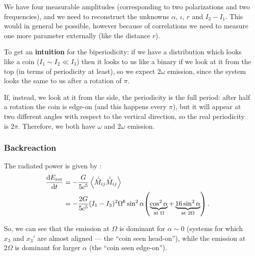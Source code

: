 \documentclass[main.tex]{subfiles}
\begin{document}

We have four measurable amplitudes (corresponding to two polarizations and two frequencies), and we need to reconstruct the unknowns \(\alpha \), \(\iota \), \(r\) and \(I_3 - I_1 \).
This would in general be possible, however because of correlations we need to measure one more parameter externally (like the distance \(r\)).

To get an \textbf{intuition} for the biperiodicity: if we have a distribution which looks like a coin (\(I_1 \sim I_2 \ll I_3 \)) then it looks to us like a binary if we look at it from the top (in terms of periodicity at least), so we expect \(2 \omega \) emission, since the system looks the same to us after a rotation of \(\pi \). 

If, instead, we look at it from the side, the periodicity is the full period: after half a rotation the coin is edge-on (and this happens every \(\pi \)), but it will appear at two different angles with respect to the vertical direction, so the real periodicity is \(2 \pi \).
Therefore, we both have \(\omega \) and \(2 \omega \) emission. 


\subsubsection{Backreaction}


The radiated power is given by \cite[eq.\ 4.254]{maggioreGravitationalWavesVolume2007}: 
%
\begin{align}
\dv{E _{\text{rot}}}{t} &= - \frac{G}{5c^{5}} 
\expval{\dot{\ddot{M}}_{ij} \dot{\ddot{M}}_{ij}}  \\
&= - \frac{2G}{5c^{5}} 
(I_1 - I_3 )^2 \Omega^{6}
\sin^2\alpha  \qty(\underbrace{\cos^2\alpha}_{\mathclap{\text{at } \Omega }}  +\underbrace{16 \sin^2\alpha}_{\mathclap{\text{at }2 \Omega }} )
\,.
\end{align}
%

So, we can see that the emission at \(\Omega \) is dominant for \(\alpha \sim 0\) (systems for which \(x_3\) and \(x_3'\) are almost aligned --- the ``coin seen head-on''), while the emission at \(2 \Omega \) is dominant for larger \(\alpha \) (the ``coin seen edge-on'').
\end{document}
